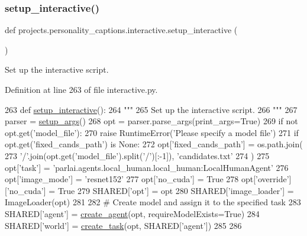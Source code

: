\subsubsection{\texorpdfstring{setup\+\_\+interactive()}{setup\_interactive()}}
{\footnotesize\ttfamily def projects.\+personality\+\_\+captions.\+interactive.\+setup\+\_\+interactive (\begin{DoxyParamCaption}{ }\end{DoxyParamCaption})}

\begin{DoxyVerb}Set up the interactive script.
\end{DoxyVerb}
 

Definition at line 263 of file interactive.\+py.


\begin{DoxyCode}
263 \textcolor{keyword}{def }\hyperlink{namespaceprojects_1_1personality__captions_1_1interactive_aa5144adf4092cfa1c2dc076d766226a1}{setup\_interactive}():
264     \textcolor{stringliteral}{"""}
265 \textcolor{stringliteral}{    Set up the interactive script.}
266 \textcolor{stringliteral}{    """}
267     parser = \hyperlink{namespaceprojects_1_1self__feeding_1_1interactive_a2ad3b874d9caef6e76ea41e029b933f0}{setup\_args}()
268     opt = parser.parse\_args(print\_args=\textcolor{keyword}{True})
269     \textcolor{keywordflow}{if} \textcolor{keywordflow}{not} opt.get(\textcolor{stringliteral}{'model\_file'}):
270         \textcolor{keywordflow}{raise} RuntimeError(\textcolor{stringliteral}{'Please specify a model file'})
271     \textcolor{keywordflow}{if} opt.get(\textcolor{stringliteral}{'fixed\_cands\_path'}) \textcolor{keywordflow}{is} \textcolor{keywordtype}{None}:
272         opt[\textcolor{stringliteral}{'fixed\_cands\_path'}] = os.path.join(
273             \textcolor{stringliteral}{'/'}.join(opt.get(\textcolor{stringliteral}{'model\_file'}).split(\textcolor{stringliteral}{'/'})[:-1]), \textcolor{stringliteral}{'candidates.txt'}
274         )
275     opt[\textcolor{stringliteral}{'task'}] = \textcolor{stringliteral}{'parlai.agents.local\_human.local\_human:LocalHumanAgent'}
276     opt[\textcolor{stringliteral}{'image\_mode'}] = \textcolor{stringliteral}{'resnet152'}
277     opt[\textcolor{stringliteral}{'no\_cuda'}] = \textcolor{keyword}{True}
278     opt[\textcolor{stringliteral}{'override'}][\textcolor{stringliteral}{'no\_cuda'}] = \textcolor{keyword}{True}
279     SHARED[\textcolor{stringliteral}{'opt'}] = opt
280     SHARED[\textcolor{stringliteral}{'image\_loader'}] = ImageLoader(opt)
281 
282     \textcolor{comment}{# Create model and assign it to the specified task}
283     SHARED[\textcolor{stringliteral}{'agent'}] = \hyperlink{namespaceparlai_1_1core_1_1agents_ad0d54074d4bcc148bb415ab5515a53b5}{create\_agent}(opt, requireModelExists=\textcolor{keyword}{True})
284     SHARED[\textcolor{stringliteral}{'world'}] = \hyperlink{namespaceparlai_1_1core_1_1worlds_a11923c10b545c7ecc1b08fe2242d9c2c}{create\_task}(opt, SHARED[\textcolor{stringliteral}{'agent'}])
285 
286 
\end{DoxyCode}


